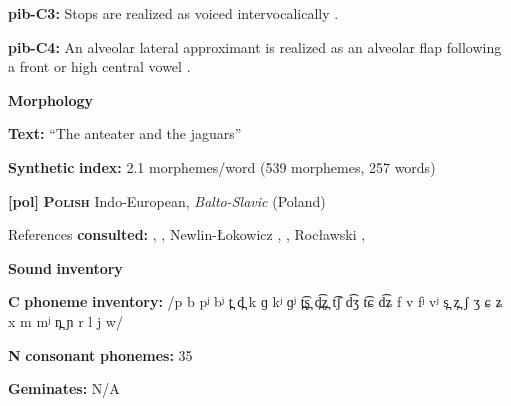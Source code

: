 \begin{styleBody}
\textbf{pib-C3:} Stops are realized as voiced intervocalically \citep[17]{Hanson2010}.
\end{styleBody}

\begin{styleBody}
\textbf{pib-C4:} An alveolar lateral approximant is realized as an alveolar flap following a front or high central vowel \citep[24]{Hanson2010}.
\end{styleBody}

\begin{styleBody}
\textbf{Morphology}
\end{styleBody}

\begin{styleBody}
\textbf{Text:} “The anteater and the jaguars” \citep[379-386]{Hanson2010}
\end{styleBody}

\begin{styleBody}
\textbf{Synthetic} \textbf{index:} 2.1 morphemes/word (539 morphemes, 257 words)
\end{styleBody}

\begin{styleBody}
\textbf{[pol]}   \textbf{\textsc{Polish}}  Indo-European, \textit{Balto-Slavic} (Poland)
\end{styleBody}

\begin{styleBody}
References \textbf{consulted:} \citet{Gussman2007}, \citet{Jassem2003}, Newlin-Łokowicz , \citet{Nowak2006}, Rocławski , \citet{Zydorowicz2010}
\end{styleBody}

\begin{styleBody}
\textbf{Sound} \textbf{inventory}
\end{styleBody}

\begin{styleBody}
\textbf{C} \textbf{phoneme} \textbf{inventory:} /p b pʲ bʲ t̪ d̪ k ɡ kʲ ɡʲ t̪͡s̪ d̪͡z̪ t͡ʃ d͡ʒ t͡ɕ d͡ʑ f v fʲ vʲ s̪ z̪ ʃ ʒ ɕ ʑ x m mʲ n̪ ɲ r l j w/
\end{styleBody}

\begin{styleBody}
\textbf{N} \textbf{consonant} \textbf{phonemes:} 35
\end{styleBody}

\begin{styleBody}
\textbf{Geminates:} N/A
\end{styleBody}

